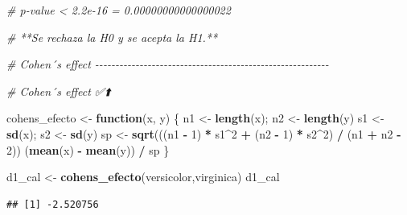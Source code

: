 \documentclass[
]{article}
\newenvironment{Shaded}{\begin{snugshade}}{\end{snugshade}}
\newcommand{\CommentTok}[1]{\textcolor[rgb]{0.56,0.35,0.01}{\textit{#1}}}
\newcommand{\ControlFlowTok}[1]{\textcolor[rgb]{0.13,0.29,0.53}{\textbf{#1}}}
\newcommand{\DecValTok}[1]{\textcolor[rgb]{0.00,0.00,0.81}{#1}}
\newcommand{\FunctionTok}[1]{\textcolor[rgb]{0.13,0.29,0.53}{\textbf{#1}}}
\newcommand{\NormalTok}[1]{#1}
\newcommand{\OtherTok}[1]{\textcolor[rgb]{0.56,0.35,0.01}{#1}}
\newcommand{\SpecialCharTok}[1]{\textcolor[rgb]{0.81,0.36,0.00}{\textbf{#1}}}
\begin{document}
\begin{Shaded}
\begin{Highlighting}[]
\CommentTok{\# p{-}value \textless{} 2.2e{-}16 = 0.00000000000000022 }

\CommentTok{\# **Se rechaza la H0 y se acepta la H1.**}


\CommentTok{\# Cohen´s effect {-}{-}{-}{-}{-}{-}{-}{-}{-}{-}{-}{-}{-}{-}{-}{-}{-}{-}{-}{-}{-}{-}{-}{-}{-}{-}{-}{-}{-}{-}{-}{-}{-}{-}{-}{-}{-}{-}{-}{-}{-}{-}{-}{-}{-}{-}{-}{-}{-}{-}{-}{-}{-}{-}{-}{-}{-}{-}}

\CommentTok{\# Cohen´s effect ✅⬆️}

\NormalTok{cohens\_efecto }\OtherTok{\textless{}{-}} \ControlFlowTok{function}\NormalTok{(x, y) \{}
\NormalTok{  n1 }\OtherTok{\textless{}{-}} \FunctionTok{length}\NormalTok{(x); n2 }\OtherTok{\textless{}{-}} \FunctionTok{length}\NormalTok{(y)}
\NormalTok{  s1 }\OtherTok{\textless{}{-}} \FunctionTok{sd}\NormalTok{(x); s2 }\OtherTok{\textless{}{-}} \FunctionTok{sd}\NormalTok{(y)}
\NormalTok{  sp }\OtherTok{\textless{}{-}} \FunctionTok{sqrt}\NormalTok{(((n1 }\SpecialCharTok{{-}} \DecValTok{1}\NormalTok{) }\SpecialCharTok{*}\NormalTok{ s1}\SpecialCharTok{\^{}}\DecValTok{2} \SpecialCharTok{+}\NormalTok{ (n2 }\SpecialCharTok{{-}} \DecValTok{1}\NormalTok{) }\SpecialCharTok{*}\NormalTok{ s2}\SpecialCharTok{\^{}}\DecValTok{2}\NormalTok{) }\SpecialCharTok{/}\NormalTok{ (n1 }\SpecialCharTok{+}\NormalTok{ n2 }\SpecialCharTok{{-}} \DecValTok{2}\NormalTok{))}
\NormalTok{  (}\FunctionTok{mean}\NormalTok{(x) }\SpecialCharTok{{-}} \FunctionTok{mean}\NormalTok{(y)) }\SpecialCharTok{/}\NormalTok{ sp}
\NormalTok{\}}


\NormalTok{d1\_cal }\OtherTok{\textless{}{-}} \FunctionTok{cohens\_efecto}\NormalTok{(versicolor,virginica)}
\NormalTok{d1\_cal}
\end{Highlighting}
\end{Shaded}

\begin{verbatim}
## [1] -2.520756
\end{verbatim}
\end{document}
